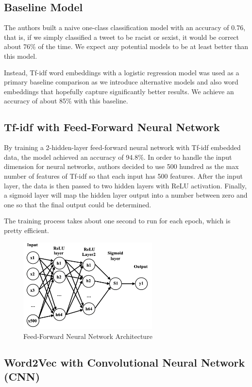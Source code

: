 \documentclass[conference]{IEEEtran}
\begin{document}
\subsection{Baseline Model}
The authors built a naive one-class classification model with an accuracy of 0.76, that is, if we simply classified a tweet to be racist or sexist, it would be correct about 76\% of the time. We expect any potential models to be at least better than this model.

	Instead, Tf-idf word embeddings with a logistic regression model was used as a primary baseline comparison as we introduce alternative models and also word embeddings that hopefully capture significantly better results. We achieve an accuracy of about 85\% with this baseline.


\subsection{Tf-idf with Feed-Forward Neural Network}
By training a 2-hidden-layer feed-forward neural network with Tf-idf embedded data, the model achieved an accuracy of 94.8\%. In order to handle the input dimension for neural networks, authors decided to use 500 hundred as the max number of features of Tf-idf so that each input has 500 features. After the input layer, the data is then passed to two hidden layers with ReLU activation. Finally, a sigmoid layer will map the hidden layer output into a number between zero and one so that the final output could be determined.

The training process takes about one second to run for each epoch, which is pretty efficient.

\begin{figure}[htbp]
\centerline{\includegraphics[width=70mm]{fig1.png}}
\caption{Feed-Forward Neural Network Architecture}
\label{fig}
\end{figure}

\subsection{Word2Vec with Convolutional Neural Network (CNN)}
\end{document}

